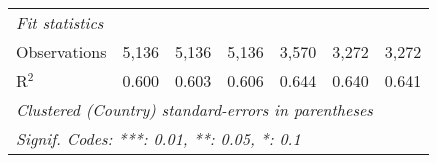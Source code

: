 \begin{tabular}{lcccccc}
   \midrule \emph{Fit statistics}\\
   Observations                                                                                       & 5,136   & 5,136          & 5,136          & 3,570          & 3,272          & 3,272\\  
   R$^2$                                                                                              & 0.600   & 0.603          & 0.606          & 0.644          & 0.640          & 0.641\\  
   \midrule
   \multicolumn{7}{l}{\emph{Clustered (Country) standard-errors in parentheses}}\\
   \multicolumn{7}{l}{\emph{Signif. Codes: ***: 0.01, **: 0.05, *: 0.1}}\\
\end{tabular}
\par\endgroup


